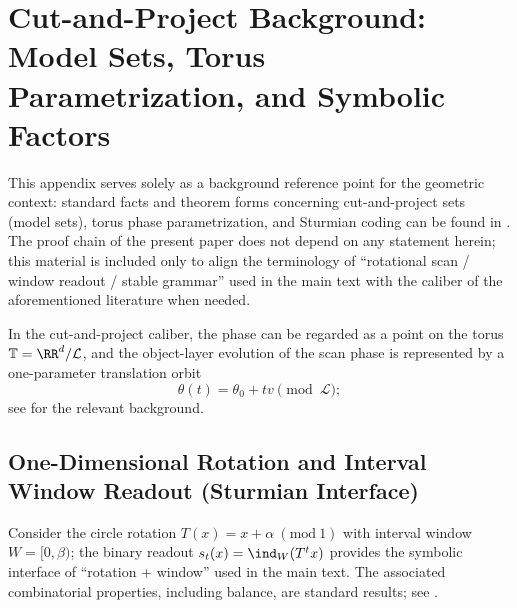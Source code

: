\section{Cut-and-Project Background: Model Sets, Torus Parametrization, and Symbolic Factors}\label{app:cut_project_background}

This appendix serves solely as a background reference point for the geometric context: standard facts and theorem forms concerning cut-and-project sets (model sets), torus phase parametrization, and Sturmian coding can be found in \cite{BaakeGrimmAperiodicOrder1,MeyerAlgebraicNumbers,QueffelecSubstitution,LindMarcus1995}. The proof chain of the present paper does not depend on any statement herein; this material is included only to align the terminology of ``rotational scan / window readout / stable grammar'' used in the main text with the caliber of the aforementioned literature when needed.

\begin{remark}\label{rem:app-cutproject-phason-time}
In the cut-and-project caliber, the phase can be regarded as a point on the torus \(\mathbb{T}=\RR^{d}/\mathcal{L}\), and the object-layer evolution of the scan phase is represented by a one-parameter translation orbit
\[
\theta(t)=\theta_0+t v\pmod{\mathcal{L}};
\]
see \cite{BaakeGrimmAperiodicOrder1,MeyerAlgebraicNumbers} for the relevant background.
\end{remark}

\subsection{One-Dimensional Rotation and Interval Window Readout (Sturmian Interface)}
Consider the circle rotation \(T(x)=x+\alpha\ (\mathrm{mod}\ 1)\) with interval window \(W=[0,\beta)\); the binary readout \(s_t(x)=\ind_W(T^t x)\) provides the symbolic interface of ``rotation + window'' used in the main text. The associated combinatorial properties, including balance, are standard results; see \cite{LindMarcus1995}.
